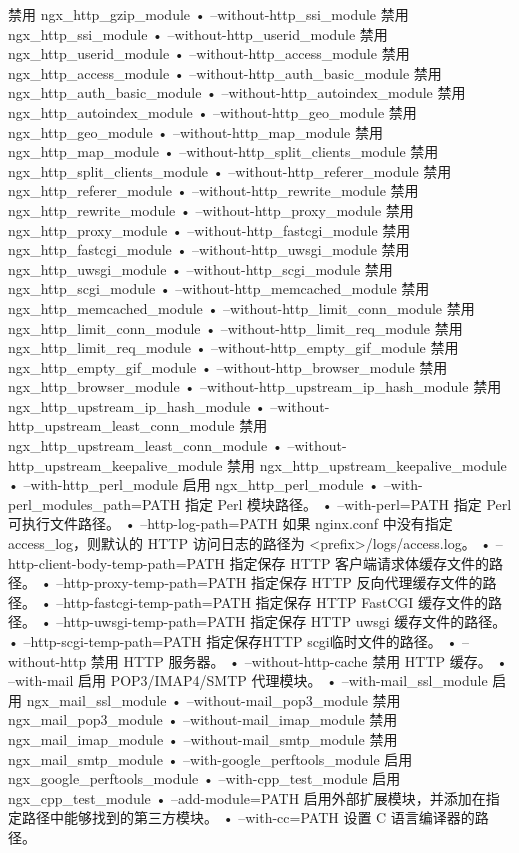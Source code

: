 \begin{compactitem}
禁用 ngx_http_gzip_module
• --without-http_ssi_module
禁用 ngx_http_ssi_module
• --without-http_userid_module
禁用 ngx_http_userid_module
• --without-http_access_module
禁用 ngx_http_access_module
• --without-http_auth_basic_module
禁用 ngx_http_auth_basic_module
• --without-http_autoindex_module
禁用 ngx_http_autoindex_module
• --without-http_geo_module
禁用 ngx_http_geo_module
• --without-http_map_module
禁用 ngx_http_map_module
• --without-http_split_clients_module
禁用 ngx_http_split_clients_module
• --without-http_referer_module
禁用 ngx_http_referer_module
• --without-http_rewrite_module
禁用 ngx_http_rewrite_module
• --without-http_proxy_module
禁用 ngx_http_proxy_module
• --without-http_fastcgi_module
禁用 ngx_http_fastcgi_module
• --without-http_uwsgi_module
禁用 ngx_http_uwsgi_module
• --without-http_scgi_module
禁用 ngx_http_scgi_module
• --without-http_memcached_module
禁用 ngx_http_memcached_module
• --without-http_limit_conn_module
禁用 ngx_http_limit_conn_module
• --without-http_limit_req_module
禁用 ngx_http_limit_req_module
• --without-http_empty_gif_module
禁用 ngx_http_empty_gif_module
• --without-http_browser_module
禁用 ngx_http_browser_module
• --without-http_upstream_ip_hash_module
禁用 ngx_http_upstream_ip_hash_module
• --without-http_upstream_least_conn_module
禁用 ngx_http_upstream_least_conn_module
• --without-http_upstream_keepalive_module
禁用 ngx_http_upstream_keepalive_module
• --with-http_perl_module
启用 ngx_http_perl_module
• --with-perl_modules_path=PATH
指定 Perl 模块路径。
• --with-perl=PATH
指定 Perl 可执行文件路径。
• --http-log-path=PATH
如果 nginx.conf 中没有指定 access_log，则默认的 HTTP 访问日志的路径为 <prefix>/logs/access.log。
• --http-client-body-temp-path=PATH
指定保存 HTTP 客户端请求体缓存文件的路径。
• --http-proxy-temp-path=PATH
指定保存 HTTP 反向代理缓存文件的路径。
• --http-fastcgi-temp-path=PATH
指定保存 HTTP FastCGI 缓存文件的路径。
• --http-uwsgi-temp-path=PATH
指定保存 HTTP uwsgi 缓存文件的路径。
• --http-scgi-temp-path=PATH
指定保存HTTP scgi临时文件的路径。
• --without-http
禁用 HTTP 服务器。
• --without-http-cache
禁用 HTTP 缓存。
• --with-mail
启用 POP3/IMAP4/SMTP 代理模块。
• --with-mail_ssl_module
启用 ngx_mail_ssl_module
• --without-mail_pop3_module
禁用 ngx_mail_pop3_module
• --without-mail_imap_module
禁用 ngx_mail_imap_module
• --without-mail_smtp_module
禁用 ngx_mail_smtp_module
• --with-google_perftools_module
启用 ngx_google_perftools_module
• --with-cpp_test_module
启用 ngx_cpp_test_module
• --add-module=PATH
启用外部扩展模块，并添加在指定路径中能够找到的第三方模块。
• --with-cc=PATH
设置 C 语言编译器的路径。

\end{compactitem}

